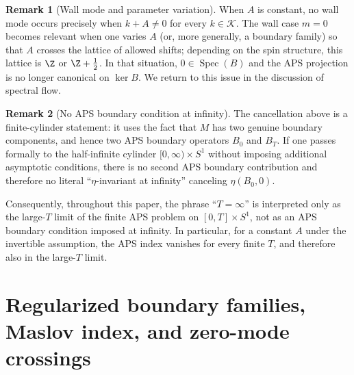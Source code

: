 \documentclass[11pt]{article}
\theoremstyle{definition}
\newtheorem{remark}[remark]{Remark}
\DeclareMathOperator{\Spec}{Spec}
\numberwithin{equation}{section}
\begin{document}
\begin{remark}[Wall mode and parameter variation]
\label{rem:wall-mode}
When $A$ is constant, no wall mode occurs precisely when $k+A\neq 0$ for every $k\in\mathcal K$.
The wall case $m=0$ becomes relevant when one varies $A$ (or, more generally, a boundary family) so that $A$ crosses the lattice of allowed shifts; depending on the spin structure, this lattice is $\Z$ or $\Z+\tfrac12$.
In that situation, $0\in\Spec(B)$ and the APS projection is no longer canonical on $\ker B$.
We return to this issue in the discussion of spectral flow.
\end{remark}

\begin{remark}[No APS boundary condition at infinity]
\label{rem:no-eta-at-infinity}
The cancellation above is a finite-cylinder statement: it uses the fact that $M$ has two genuine boundary components, and hence two APS boundary operators $B_0$ and $B_T$.
If one passes formally to the half-infinite cylinder $[0,\infty)\times S^1$ without imposing additional asymptotic conditions, there is no second APS boundary contribution and therefore no literal ``$\eta$-invariant at infinity'' canceling $\eta(B_0,0)$.

Consequently, throughout this paper, the phrase ``$T=\infty$'' is interpreted only as the large-$T$ limit of the finite APS problem on $[0,T]\times S^1$, not as an APS boundary condition imposed at infinity.
In particular, for a constant $A$ under the invertible assumption, the APS index vanishes for every finite $T$, and therefore also in the large-$T$ limit.
\end{remark}
















\section{Regularized boundary families, Maslov index, and zero-mode crossings}\label{sec:maslov}
\end{document}
